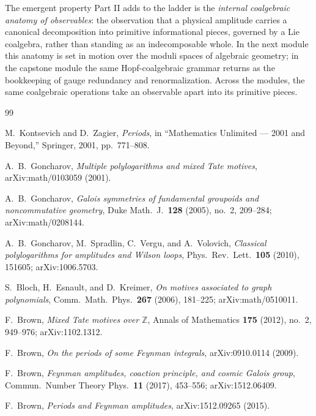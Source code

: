 \documentclass[12pt]{article}
\theoremstyle{definition}
\theoremstyle{remark}
\newcommand{\Zbb}{\mathbb{Z}}
\begin{document}
The emergent property Part II adds to the ladder is the \emph{internal coalgebraic anatomy of
observables}: the observation that a physical amplitude carries a canonical decomposition
into primitive informational pieces, governed by a Lie coalgebra, rather than standing as an
indecomposable whole. In the next module this anatomy is set in motion over the moduli spaces
of algebraic geometry; in the capstone module the same Hopf-coalgebraic grammar returns as the
bookkeeping of gauge redundancy and renormalization. Across the modules, the same coalgebraic
operations take an observable apart into its primitive pieces.

\begin{thebibliography}{99}
\sloppy
{}

M.~Kontsevich and D.~Zagier,
\emph{Periods}, in ``Mathematics Unlimited --- 2001 and Beyond,'' Springer, 2001, pp.~771--808.

A.~B.~Goncharov,
\emph{Multiple polylogarithms and mixed Tate motives}, arXiv:math/0103059 (2001).

A.~B.~Goncharov,
\emph{Galois symmetries of fundamental groupoids and noncommutative geometry},
Duke Math.\ J.\ \textbf{128} (2005), no.~2, 209--284; arXiv:math/0208144.

A.~B.~Goncharov, M.~Spradlin, C.~Vergu, and A.~Volovich,
\emph{Classical polylogarithms for amplitudes and Wilson loops},
Phys.\ Rev.\ Lett.\ \textbf{105} (2010), 151605; arXiv:1006.5703.

S.~Bloch, H.~Esnault, and D.~Kreimer,
\emph{On motives associated to graph polynomials},
Comm.\ Math.\ Phys.\ \textbf{267} (2006), 181--225; arXiv:math/0510011.

F.~Brown,
\emph{Mixed Tate motives over $\Zbb$},
Annals of Mathematics \textbf{175} (2012), no.~2, 949--976; arXiv:1102.1312.

F.~Brown,
\emph{On the periods of some Feynman integrals}, arXiv:0910.0114 (2009).

F.~Brown,
\emph{Feynman amplitudes, coaction principle, and cosmic Galois group},
Commun.\ Number Theory Phys.\ \textbf{11} (2017), 453--556; arXiv:1512.06409.

F.~Brown,
\emph{Periods and Feynman amplitudes}, arXiv:1512.09265 (2015).


\end{thebibliography}
\end{document}
